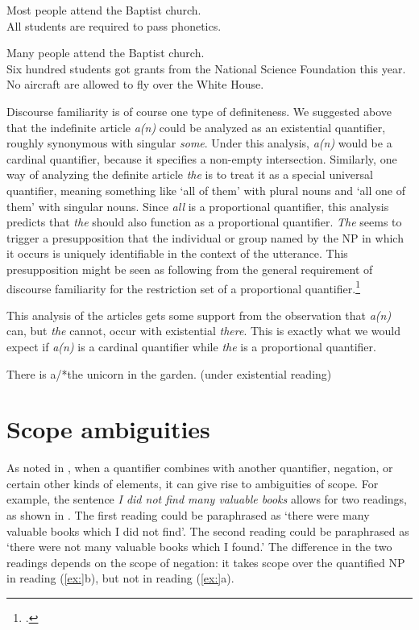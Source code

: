 \ea
\ea Most people attend the Baptist church.\\
\ex All students are required to pass phonetics.
                       \z
\z

\ea
\ea Many people attend the Baptist church.\\
\ex Six hundred students got grants from the National Science Foundation this year.\\
\ex No aircraft are allowed to fly over the White House.
                       \z
\z


Discourse familiarity is of course one type of definiteness. We suggested above that the indefinite article \textit{a(n)} could be analyzed as an existential quantifier, roughly synonymous with singular \textit{some}. Under this analysis, \textit{a(n)} would be a cardinal quantifier, because it specifies a non-empty intersection. Similarly, one way of analyzing the definite article \textit{the} is to treat it as a special universal quantifier, meaning something like ‘all of them’ with plural nouns and ‘all one of them’ with singular nouns. Since \textit{all} is a proportional quantifier, this analysis predicts that \textit{the} should also function as a proportional quantifier. \textit{The} seems to trigger a presupposition that the individual or group named by the NP in which it occurs is uniquely identifiable in the context of the utterance. This presupposition might be seen as following from the general requirement of discourse familiarity for the restriction set of a proportional quantifier.\footnote{\citet{Kearn2000}.}



This analysis of the articles gets some support from the observation that \textit{a(n)} can, but \textit{the} cannot, occur with existential \textit{there}. This is exactly what we would expect if \textit{a(n)} is a cardinal quantifier while \textit{the} is a proportional quantifier.


\ea






  There is a/*the unicorn in the garden.  (under existential reading)
\z

\section{Scope ambiguities}\label{sec:} %

As noted in , when a quantifier combines with another quantifier, negation, or certain other kinds of elements, it can give rise to ambiguities of scope. For example, the sentence \textit{I did not find many valuable books} allows for two readings, as shown in . The first reading could be paraphrased as ‘there were many valuable books which I did not find’. The second reading could be paraphrased as ‘there were not many valuable books which I found.’ The difference in the two readings depends on the scope of negation: it takes scope over the quantified NP in reading (\ref{ex:}b), but not in reading (\ref{ex:}a).


